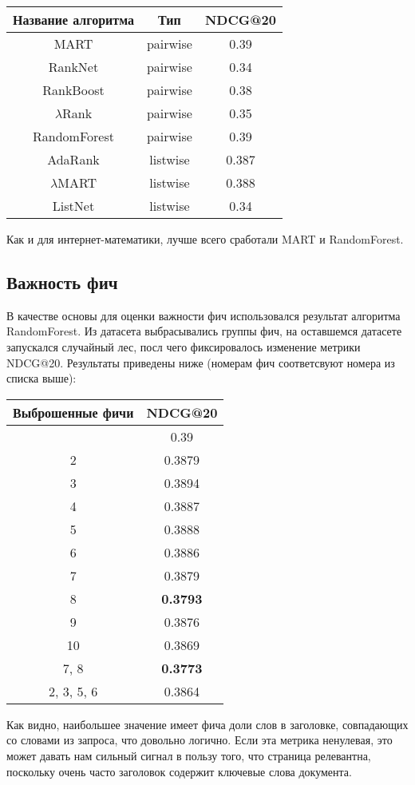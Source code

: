 \begin{tabular}{|c|c|c|}
	\hline
	
	Название алгоритма & Тип& NDCG@20\\
	\hline
	MART & pairwise & 0.39\\
	RankNet & pairwise & 0.34\\
	RankBoost & pairwise & 0.38\\
	$\lambda$Rank & pairwise & 0.35\\
	RandomForest& pairwise & 0.39\\
	\hline
	AdaRank & listwise & 0.387\\
	$\lambda$MART & listwise & 0.388\\
	ListNet & listwise & 0.34\\
	\hline
\end{tabular}

Как и для интернет-математики, лучше всего сработали MART и RandomForest.

\subsection{Важность фич}

В качестве основы для оценки важности фич использовался результат алгоритма RandomForest. Из датасета выбрасывались группы фич, на оставшемся датасете запускался случайный лес, посл чего фиксировалось изменение метрики NDCG@20. Результаты приведены ниже (номерам фич соответсвуют номера из списка выше):

\begin{tabular}{|c|c|}
	\hline
	
	Выброшенные фичи & NDCG@20\\
	\hline
	& 0.39 \\
	\hline
	2& 0.3879 \\
	3& 0.3894 \\
	4& 0.3887 \\
	5& 0.3888 \\
	6& 0.3886 \\
	7& 0.3879 \\
	8& {\bf 0.3793} \\
	9& 0.3876 \\
	10& 0.3869 \\
	7, 8&  {\bf 0.3773} \\
	2, 3, 5, 6& 0.3864 \\
	\hline
\end{tabular} 

Как видно, наибольшее значение имеет фича доли слов в заголовке, совпадающих со словами из запроса, что довольно логично. Если эта метрика ненулевая, это может давать нам сильный сигнал в пользу того, что страница релевантна, поскольку очень часто заголовок содержит ключевые слова документа.

